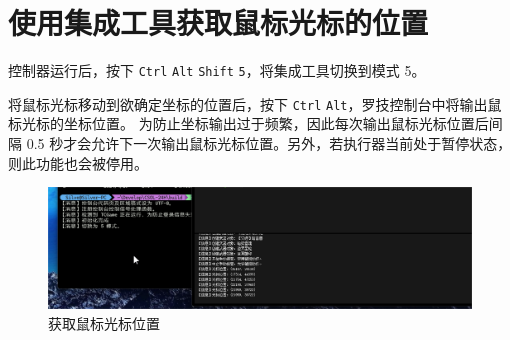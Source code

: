 \section{使用集成工具获取鼠标光标的位置}

控制器运行后，按下 \lstinline{Ctrl} \lstinline{Alt} \lstinline{Shift} \lstinline{5}，将集成工具切换到模式 5。

将鼠标光标移动到欲确定坐标的位置后，按下 \lstinline{Ctrl} \lstinline{Alt}，罗技控制台中将输出鼠标光标的坐标位置。
为防止坐标输出过于频繁，因此每次输出鼠标光标位置后间隔 0.5 秒才会允许下一次输出鼠标光标位置。另外，若执行器当前处于暂停状态，则此功能也会被停用。

\begin{figure}[H]
    \Centering
    \includegraphics[width=\textwidth]{docs/assets/position.png}
    \caption{获取鼠标光标位置}
\end{figure}